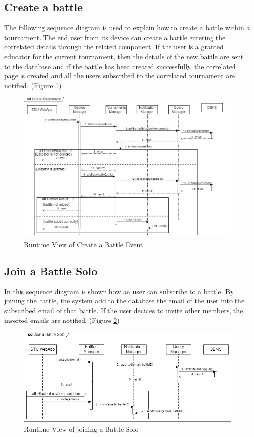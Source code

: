 \subsection{Create a battle}
The following sequence diagram is used to explain how to create a battle within a tournament. The end user from its device can create a battle entering the correlated details through the related component. If the user is a granted educator for the current tournament, then the details of the new battle are sent to the database and if the battle has been created successfully, the correlated page is created and all the users subscribed to the correlated tournament are notified. (Figure \ref{fig:RuntimeView_CreateBattle}) 
\begin{figure}[H]
    \centering
    \includegraphics[width=\textwidth]{images/runtimeviews/RuntimeView_CreateBattle.png}
    \caption{Runtime View of Create a Battle Event}
    \label{fig:RuntimeView_CreateBattle}
\end{figure}

\subsection{Join a Battle Solo}
In this sequence diagram is shown how an user can subscribe to a battle. By joining the battle, the system add to the database the email of the user into the subscribed email of that battle. If the user decides to invite other members, the inserted emails are notified. (Figure \ref{fig:RuntimeView_JoinBattleSolo})
\begin{figure}[H]
    \centering
    \includegraphics[width=\textwidth]{images/runtimeviews/RuntimeView_JoinBattleSolo.png}
    \caption{Runtime View of joining a Battle Solo}
    \label{fig:RuntimeView_JoinBattleSolo}
\end{figure}

